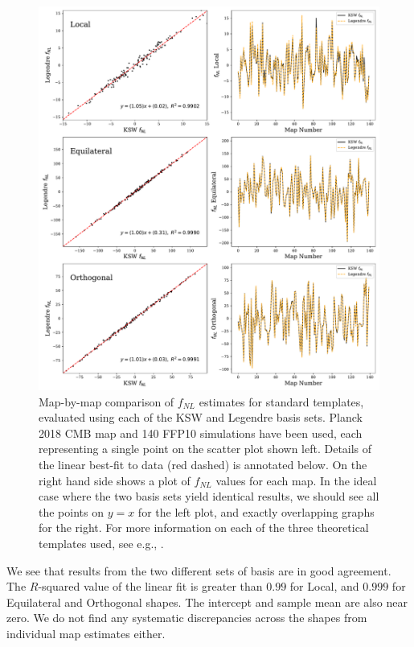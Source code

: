 \begin{figure}[htbp!] 
	\centering 
	\includegraphics[width=\textwidth]{map_by_map_Legendre_KSW.pdf}
	\caption{Map-by-map comparison of $f_{NL}$ estimates for standard templates, evaluated using each of the KSW and Legendre basis sets. Planck 2018 CMB map and 140 FFP10 simulations have been used, each representing a single point on the scatter plot shown left. Details of the linear best-fit to data (red dashed) is annotated below. On the right hand side shows a plot of $f_{NL}$ values for each map. In the ideal case where the two basis sets yield identical results, we should see all the points on $y=x$ for the left plot, and exactly overlapping graphs for the right. For more information on  each of the three theoretical templates used, see e.g., \cite{PlanckCollaboration2013}.}
	\label{fig:map_by_map_Legendre_KSW}
\end{figure}

We see that results from the two different sets of basis are in good agreement. The $R$-squared value of the linear fit is greater than $0.99$ for Local, and $0.999$ for Equilateral and Orthogonal shapes. The intercept and sample mean are also near zero. We do not find any systematic discrepancies across the shapes from individual map estimates either.

